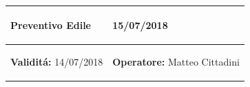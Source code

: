 \documentclass[a4paper]{article}
\begin{document}
  \begin{center}
  \begin{tabular}{|L{89mm} R{60mm}| }
  \hline
  \vspace{2.5mm}
  \begin{spacing}{0}
    \textbf{Preventivo Edile}
  \end{spacing}&
  \vspace{2.5mm}
  \begin{spacing}{0}
    15/07/2018
  \end{spacing}\\
  \hline
  \vspace{2.5mm}
  \begin{spacing}{0}
    \textbf{Validit\'a:} 14/07/2018
  \end{spacing} &
  \vspace{2.5mm}
  \begin{spacing}{0}
    \textbf{Operatore:} Matteo Cittadini
  \end{spacing} \\
  \hline
  \end{tabular}
  \end{center}
\end{document}
